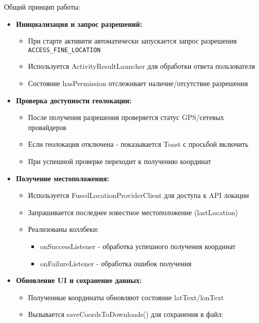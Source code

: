 Общий принцип работы:

\begin{itemize}
    \item  \textbf{Инициализация и запрос разрешений:}
        \begin{itemize}
            \item При старте активити автоматически запускается запрос разрешения \texttt{ACCESS\_FINE\_LOCATION}
            \item Используется ActivityResultLauncher для обработки ответа пользователя
            \item Состояние hasPermission отслеживает наличие/отсутствие разрешения
        \end{itemize}
    \item \textbf{Проверка доступности геолокации:}
        \begin{itemize}
            \item После получения разрешения проверяется статус GPS/сетевых провайдеров
            \item Если геолокация отключена - показывается Toast с просьбой включить
            \item При успешной проверке переходит к получению координат
        \end{itemize}
    \item \textbf{Получение местоположения:}
        \begin{itemize}
            \item Используется FusedLocationProviderClient для доступа к API локации
            \item Запрашивается последнее известное местоположение (lastLocation)
            \item Реализованы коллбеки:
            \begin{itemize}
                \item onSuccessListener - обработка успешного получения координат
                \item onFailureListener - обработка ошибок получения
            \end{itemize}
        \end{itemize}
    \item \textbf{Обновление UI и сохранение данных:}
        \begin{itemize}
            \item Полученные координаты обновляют состояние latText/lonText
            \item Вызывается saveCoordsToDownloads() для сохранения в файл:

\end{itemize}
\end{itemize}
